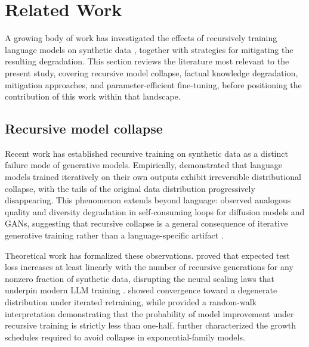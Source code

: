 \documentclass[a4paper,fleqn]{cas-dc}
\begin{document}
\section{Related Work}\label{sec:related}

A growing body of work has investigated the effects of recursively training
language models on synthetic data \citep{villalobos2024}, together with
strategies for mitigating the resulting degradation. This section reviews the
literature most relevant to the present study, covering recursive model
collapse, factual knowledge degradation, mitigation approaches, and
parameter-efficient fine-tuning, before positioning the contribution of this
work within that landscape.

\subsection{Recursive model collapse}

Recent work has established recursive training on synthetic data as a distinct
failure mode of generative models. Empirically, \citet{shumailov2024}
demonstrated that language models trained iteratively on their own outputs
exhibit irreversible distributional collapse, with the tails of the original
data distribution progressively disappearing. This phenomenon extends beyond
language: \citet{alemohammad2024} observed analogous quality and diversity
degradation in self-consuming loops for diffusion models and GANs, suggesting
that recursive collapse is a general consequence of iterative generative
training rather than a language-specific artifact \citep{guo2024collapse}.

Theoretical work has formalized these observations. \citet{dohmatob2025}
proved that expected test loss increases at least linearly with the number of
recursive generations for any nonzero fraction of synthetic data, disrupting
the neural scaling laws that underpin modern LLM training
\citep{kaplan2020scaling,dohmatob2024scaling}.
\citet{seddik2024} showed convergence toward a degenerate distribution under
iterated retraining, while \citet{xu2025} provided a random-walk interpretation
demonstrating that the probability of model improvement under recursive training
is strictly less than one-half. \citet{dey2024} further characterized the
growth schedules required to avoid collapse in exponential-family models.
\end{document}
